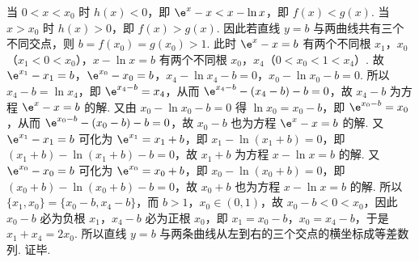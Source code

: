 \begin{solution}
\begin{enumerate}
当 \(0<x<x_0\) 时 \(h(x)<0\)，即 \(\e^x-x<x-\ln x\)，即 \(f(x)<g(x)\).
当 \(x>x_0\) 时 \(h(x)>0\)，即 \(f(x)>g(x)\).
因此若直线 \(y=b\) 与两曲线共有三个不同交点，则 \(b=f(x_0)=g(x_0)>1\).
此时 \(\e^x-x=b\) 有两个不同根 \(x_1\)，\(x_0\)（\(x_1<0<x_0\)），\(x-\ln x=b\) 有两个不同根 \(x_0\)，\(x_4\)（\(0<x_0<1<x_4\)）.
故 \(\e^{x_1}-x_1=b\)，\(\e^{x_0}-x_0=b\)，\(x_4-\ln x_4-b=0\)，\(x_0-\ln x_0-b=0\).
所以 \(x_4-b=\ln x_4\)，即 \(\e^{x_4-b}=x_4\)，从而 \(\e^{x_4-b}-\left(x_4-b\right)-b=0\)，故 \(x_4-b\) 为方程 \(\e^x-x=b\) 的解.
又由 \(x_0-\ln x_0-b=0\) 得 \(\ln x_0=x_0-b\)，即 \(\e^{x_0-b}=x_0\)，从而 \(\e^{x_0-b}-\left(x_0-b\right)-b=0\)，故 \(x_0-b\) 也为方程 \(\e^x-x=b\) 的解.
又 \(\e^{x_1}-x_1=b\) 可化为 \(\e^{x_1}=x_1+b\)，即 \(x_1-\ln\left(x_1+b\right)=0\)，即 \(\left(x_1+b\right)-\ln\left(x_1+b\right)-b=0\)，故 \(x_1+b\) 为方程 \(x-\ln x=b\) 的解.
又 \(\e^{x_0}-x_0=b\) 可化为 \(\e^{x_0}=x_0+b\)，即 \(x_0-\ln\left(x_0+b\right)=0\)，即 \(\left(x_0+b\right)-\ln\left(x_0+b\right)-b=0\)，故 \(x_0+b\) 也为方程 \(x-\ln x=b\) 的解.
所以 \(\{x_1,x_0\}=\{x_0-b,x_4-b\}\)，而 \(b>1\)，\(x_0\in(0,1)\)，故 \(x_0-b<0<x_0\)，因此 \(x_0-b\) 必为负根 \(x_1\)，\(x_4-b\) 必为正根 \(x_0\)，即 \(x_1=x_0-b\)，\(x_0=x_4-b\)，于是 \(x_1+x_4=2x_0\).
所以直线 \(y=b\) 与两条曲线从左到右的三个交点的横坐标成等差数列.
证毕.
\end{enumerate}
\end{solution}

